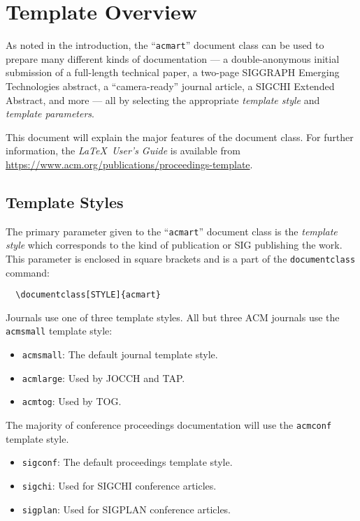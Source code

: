 \documentclass[sigplan,screen]{acmart}
\begin{document}
\section{Template Overview}
As noted in the introduction, the ``\verb|acmart|'' document class can
be used to prepare many different kinds of documentation --- a
double-anonymous initial submission of a full-length technical paper, a
two-page SIGGRAPH Emerging Technologies abstract, a ``camera-ready''
journal article, a SIGCHI Extended Abstract, and more --- all by
selecting the appropriate {\itshape template style} and {\itshape
  template parameters}.

This document will explain the major features of the document
class. For further information, the {\itshape \LaTeX\ User's Guide} is
available from
\url{https://www.acm.org/publications/proceedings-template}.

\subsection{Template Styles}

The primary parameter given to the ``\verb|acmart|'' document class is
the {\itshape template style} which corresponds to the kind of publication
or SIG publishing the work. This parameter is enclosed in square
brackets and is a part of the {\verb|documentclass|} command:
\begin{verbatim}
  \documentclass[STYLE]{acmart}
\end{verbatim}

Journals use one of three template styles. All but three ACM journals
use the {\verb|acmsmall|} template style:
\begin{itemize}
\item {\texttt{acmsmall}}: The default journal template style.
\item {\texttt{acmlarge}}: Used by JOCCH and TAP.
\item {\texttt{acmtog}}: Used by TOG.
\end{itemize}

The majority of conference proceedings documentation will use the {\verb|acmconf|} template style.
\begin{itemize}
\item {\texttt{sigconf}}: The default proceedings template style.
\item{\texttt{sigchi}}: Used for SIGCHI conference articles.
\item{\texttt{sigplan}}: Used for SIGPLAN conference articles.
\end{itemize}
\end{document}
